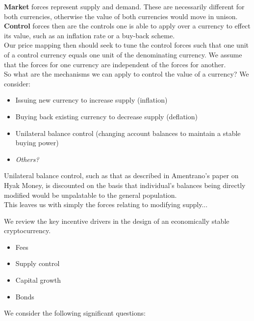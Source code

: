 \documentclass{article}
\begin{document}
\noindent \textbf{Market} forces represent supply and demand. These are necessarily different for both currencies, otherwise the value of both currencies would move in unison. \\

\noindent \textbf{Control} forces then are the controls one is able to apply over a currency to effect its value, such as an inflation rate or a buy-back scheme. \\

\noindent Our price mapping then should seek to tune the control forces such that one unit of a control currency equals one unit of the denominating currency. We assume that the forces for one currency are independent of the forces for another. \\

\noindent So what are the mechanisms we can apply to control the value of a currency? We consider:

\begin{itemize}
	\item Issuing new currency to increase supply (inflation)
	\item Buying back existing currency to decrease supply (deflation)
	\item Unilateral balance control (changing account balances to maintain a stable buying power)
	\item \textit{Others?}
\end{itemize}

\noindent Unilateral balance control, such as that as described in Amentrano's paper on Hyak Money, is discounted on the basis that individual's balances being directly modified would be unpalatable to the general population. \\

This leaves us with simply the forces relating to modifying supply...

We review the key incentive drivers in the design of an economically stable cryptocurrency. \\

\begin{itemize}
	\item Fees
	\item Supply control
	\item Capital growth
	\item Bonds
\end{itemize}

\noindent We consider the following significant questions:
\end{document}

